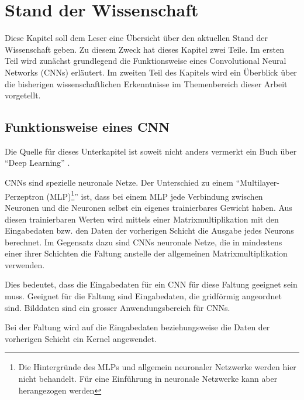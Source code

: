 \chapter{Stand der Wissenschaft}\label{sec:wissenschaft}
Diese Kapitel soll dem Leser eine Übersicht über den aktuellen Stand der Wissenschaft geben. Zu diesem Zweck hat dieses Kapitel zwei Teile. Im ersten Teil wird zunächst grundlegend die Funktionsweise eines Convolutional Neural Networks (CNNs) erläutert. Im zweiten Teil des Kapitels wird ein Überblick über die bisherigen wissenschaftlichen Erkenntnisse im Themenbereich dieser Arbeit vorgetellt.
\section{Funktionsweise eines CNN}\label{sec:conv}

Die Quelle für dieses Unterkapitel ist soweit nicht anders vermerkt ein Buch über \enquote{Deep Learning} \cite{CNNBook}.

CNNs sind spezielle neuronale Netze. Der Unterschied zu einem \enquote{Multilayer-Perzeptron (MLP)\footnote{Die Hintergründe des MLPs und allgemein neuronaler Netzwerke werden hier nicht behandelt. Für eine Einführung in neuronale Netzwerke kann aber \cite{neural} herangezogen werden}} ist, dass bei einem MLP jede Verbindung zwischen Neuronen und die Neuronen selbst ein eigenes trainierbares Gewicht haben. Aus diesen trainierbaren Werten wird mittels einer Matrixmultiplikation mit den Eingabedaten bzw. den Daten der vorherigen Schicht die Ausgabe jedes Neurons berechnet.
Im Gegensatz dazu sind CNNs neuronale Netze, die in mindestens einer ihrer Schichten die Faltung anstelle der allgemeinen Matrixmultiplikation verwenden.


Dies bedeutet, dass die Eingabedaten für ein CNN für diese Faltung geeignet sein muss. Geeignet für die Faltung sind Eingabedaten, die gridförmig angeordnet sind. Bilddaten sind ein grosser Anwendungsbereich für CNNs.

Bei der Faltung wird auf die Eingabedaten beziehungsweise die Daten der vorherigen Schicht ein Kernel angewendet.

